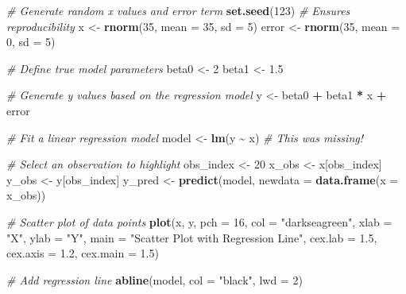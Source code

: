 \documentclass[
  letterpaper,
]{book}
\newenvironment{Shaded}{\begin{snugshade}}{\end{snugshade}}
\newcommand{\AttributeTok}[1]{\textcolor[rgb]{0.13,0.29,0.53}{#1}}
\newcommand{\CommentTok}[1]{\textcolor[rgb]{0.56,0.35,0.01}{\textit{#1}}}
\newcommand{\DecValTok}[1]{\textcolor[rgb]{0.00,0.00,0.81}{#1}}
\newcommand{\FloatTok}[1]{\textcolor[rgb]{0.00,0.00,0.81}{#1}}
\newcommand{\FunctionTok}[1]{\textcolor[rgb]{0.13,0.29,0.53}{\textbf{#1}}}
\newcommand{\NormalTok}[1]{#1}
\newcommand{\OtherTok}[1]{\textcolor[rgb]{0.56,0.35,0.01}{#1}}
\newcommand{\SpecialCharTok}[1]{\textcolor[rgb]{0.81,0.36,0.00}{\textbf{#1}}}
\newcommand{\StringTok}[1]{\textcolor[rgb]{0.31,0.60,0.02}{#1}}
\begin{document}
\begin{Shaded}
\begin{Highlighting}[]
\CommentTok{\# Generate random x values and error term}
\FunctionTok{set.seed}\NormalTok{(}\DecValTok{123}\NormalTok{)  }\CommentTok{\# Ensures reproducibility}
\NormalTok{x }\OtherTok{\textless{}{-}} \FunctionTok{rnorm}\NormalTok{(}\DecValTok{35}\NormalTok{, }\AttributeTok{mean =} \DecValTok{35}\NormalTok{, }\AttributeTok{sd =} \DecValTok{5}\NormalTok{)}
\NormalTok{error }\OtherTok{\textless{}{-}} \FunctionTok{rnorm}\NormalTok{(}\DecValTok{35}\NormalTok{, }\AttributeTok{mean =} \DecValTok{0}\NormalTok{, }\AttributeTok{sd =} \DecValTok{5}\NormalTok{)}

\CommentTok{\# Define true model parameters}
\NormalTok{beta0 }\OtherTok{\textless{}{-}} \DecValTok{2}
\NormalTok{beta1 }\OtherTok{\textless{}{-}} \FloatTok{1.5}

\CommentTok{\# Generate y values based on the regression model}
\NormalTok{y }\OtherTok{\textless{}{-}}\NormalTok{ beta0 }\SpecialCharTok{+}\NormalTok{ beta1 }\SpecialCharTok{*}\NormalTok{ x }\SpecialCharTok{+}\NormalTok{ error}

\CommentTok{\# Fit a linear regression model}
\NormalTok{model }\OtherTok{\textless{}{-}} \FunctionTok{lm}\NormalTok{(y }\SpecialCharTok{\textasciitilde{}}\NormalTok{ x)  }\CommentTok{\# This was missing!}

\CommentTok{\# Select an observation to highlight}
\NormalTok{obs\_index }\OtherTok{\textless{}{-}} \DecValTok{20}  
\NormalTok{x\_obs }\OtherTok{\textless{}{-}}\NormalTok{ x[obs\_index]}
\NormalTok{y\_obs }\OtherTok{\textless{}{-}}\NormalTok{ y[obs\_index]}
\NormalTok{y\_pred }\OtherTok{\textless{}{-}} \FunctionTok{predict}\NormalTok{(model, }\AttributeTok{newdata =} \FunctionTok{data.frame}\NormalTok{(}\AttributeTok{x =}\NormalTok{ x\_obs))  }

\CommentTok{\# Scatter plot of data points}
\FunctionTok{plot}\NormalTok{(x, y, }\AttributeTok{pch =} \DecValTok{16}\NormalTok{, }\AttributeTok{col =} \StringTok{"darkseagreen"}\NormalTok{,}
     \AttributeTok{xlab =} \StringTok{"X"}\NormalTok{, }\AttributeTok{ylab =} \StringTok{"Y"}\NormalTok{,}
     \AttributeTok{main =} \StringTok{"Scatter Plot with Regression Line"}\NormalTok{,}
     \AttributeTok{cex.lab =} \FloatTok{1.5}\NormalTok{, }\AttributeTok{cex.axis =} \FloatTok{1.2}\NormalTok{, }\AttributeTok{cex.main =} \FloatTok{1.5}\NormalTok{)}

\CommentTok{\# Add regression line}
\FunctionTok{abline}\NormalTok{(model, }\AttributeTok{col =} \StringTok{"black"}\NormalTok{, }\AttributeTok{lwd =} \DecValTok{2}\NormalTok{)}


\end{Highlighting}
\end{Shaded}
\end{document}
